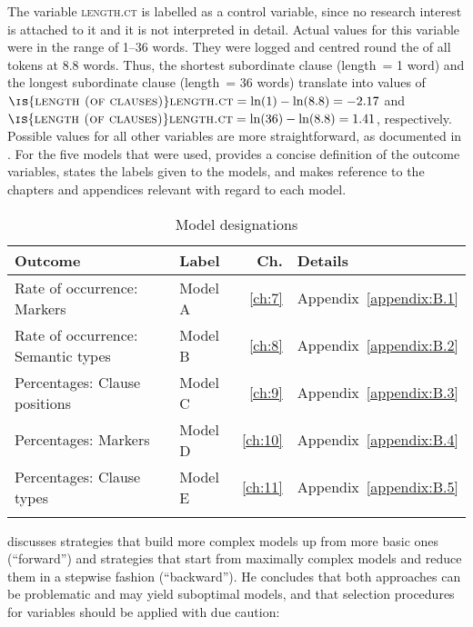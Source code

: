 The variable \textsc{length.ct} is labelled as a control variable, since no research interest is attached to it and it is not interpreted in detail. Actual values for this variable were in the range of 1–36 words. They were logged and centred round the  of all tokens at 8.8 words. Thus, the shortest subordinate clause (length~= 1 word) and the longest subordinate clause (length~= 36 words) translate into values of $\textsc{\is{length (of clauses)}length.ct} = \ln(1) - \ln(8.8)=-2.17$ and $\textsc{\is{length (of clauses)}length.ct} = \ln(36) - \ln(8.8)=1.41$, respectively. Possible values for all other variables are more straightforward, as documented in . For the five models that were used,  provides a concise definition of the outcome variables, states the labels given to the models, and makes reference to the chapters and appendices relevant with regard to each model.

\begin{table}
\caption{\label{bkm:Ref74568422}\label{tab:6.4}Model designations}
\begin{tabular}{llrl}
\lsptoprule
Outcome & Label & Ch. & Details\\\midrule
Rate of occurrence: Markers        & Model A & \ref{ch:7}  & Appendix~\ref{appendix:B.1}\\
Rate of occurrence: Semantic types & Model B & \ref{ch:8}  & Appendix~\ref{appendix:B.2}\\
Percentages: Clause positions      & Model C & \ref{ch:9}  & Appendix~\ref{appendix:B.3}\\
Percentages: Markers               & Model D & \ref{ch:10} & Appendix~\ref{appendix:B.4}\\
Percentages: Clause types          & Model E & \ref{ch:11} & Appendix~\ref{appendix:B.5}\\
\lspbottomrule
\end{tabular}
\end{table}

\citet[210]{Agresti2013} discusses  strategies that build more complex models up from more basic ones (“forward”) and strategies that start from maximally complex models and reduce them in a stepwise fashion (“backward”). He concludes that both approaches can be problematic and may yield suboptimal models, and that selection procedures for variables should be applied with due caution:

